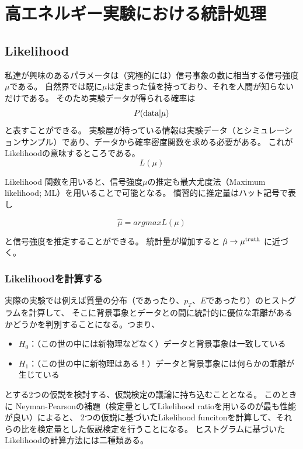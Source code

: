\chapter{高エネルギー実験における統計処理}

\section{Likelihood}
私達が興味のあるパラメータは（究極的には）信号事象の数に相当する信号強度$\mu$である。
自然界では既に$\mu$は定まった値を持っており、それを人間が知らないだけである。
そのため実験データが得られる確率は
\begin{equation}
P(\rm{data}|\mu)
\end{equation}
と表すことができる。
実験屋が持っている情報は実験データ（とシミュレーションサンプル）であり、データから確率密度関数を求める必要がある。
これがLikelihoodの意味するところである。
\begin{equation}
L(\mu)
\end{equation}

Likelihood 関数を用いると、信号強度$\mu$の推定も最大尤度法（Maximum likelihood; ML）を用いることで可能となる。
慣習的に推定量はハット記号で表し

\begin{equation}
\hat{\mu} = arg max L(\mu)
\end{equation}

と信号強度を推定することができる。
統計量が増加すると $\hat{\mu}\to\mu^{\rm{truth}}$ に近づく。

\subsection{Likelihoodを計算する}
実際の実験では例えば質量の分布（であったり、$p_T$、$E$であったり）のヒストグラムを計算して、
そこに背景事象とデータとの間に統計的に優位な乖離があるかどうかを判別することになる。つまり、

\begin{itemize}
  \item $H_0$：（この世の中には新物理などなく）データと背景事象は一致している
  \item $H_1$：（この世の中に新物理はある！）データと背景事象には何らかの乖離が生じている
\end{itemize}

とする2つの仮説を検討する、仮説検定の議論に持ち込むこととなる。
このときに Neyman-Pearsonの補題（検定量としてLikelihood ratioを用いるのが最も性能が良い）によると、
2つの仮説に基づいたLikelihood funcitonを計算して、それらの比を検定量とした仮説検定を行うことになる。
ヒストグラムに基づいたLikelihoodの計算方法には二種類ある。


